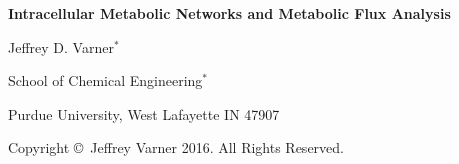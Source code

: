 \documentclass[11pt]{article}
\theoremstyle{definition}
\begin{document}
{\par\centering\textbf{\Large Intracellular Metabolic Networks and Metabolic Flux Analysis}}
\vspace{0.2in}
{\par \centering \large{Jeffrey D. Varner$^{*}$}}
\vspace{0.05in}
{\par \centering \large{School of Chemical Engineering$^{*}$}}
{\par \centering \large{Purdue University, West Lafayette IN 47907}}
\vspace{0.1in}
{\par \centering \small{Copyright \copyright\ Jeffrey Varner 2016. All Rights Reserved.}}\\

\date{}
\thispagestyle{empty}

\setcounter{page}{1}


\end{document}
